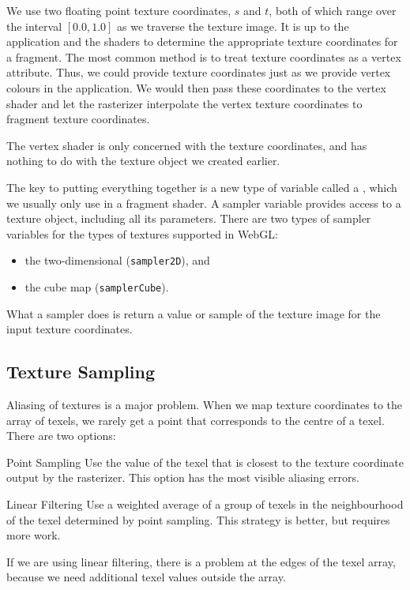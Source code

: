 \documentclass[../COS3712_Notes.tex]{subfiles}
\begin{document}
        We use two floating point texture coordinates, $s$ and $t$,
        both of which range over the interval $[0.0, 1.0]$ as we traverse the texture image.
        It is up to the application and the shaders to determine the appropriate texture
        coordinates for a fragment.
        The most common method is to treat texture coordinates as a vertex attribute.
        Thus, we could provide texture coordinates just as we provide vertex colours
        in the application.
        We would then pass these coordinates to the vertex shader and let the rasterizer
        interpolate the vertex texture coordinates to fragment texture coordinates.

        The vertex shader is only concerned with the texture coordinates,
        and has nothing to do with the texture object we created earlier.

        The key to putting everything together is a new type of variable called a ,
        which we usually only use in a fragment shader.
        A sampler variable provides access to a texture object, including all its parameters.
        There are two types of sampler variables for the types of textures supported in WebGL:
        \begin{itemize}
          \item the two-dimensional (\texttt{sampler2D}), and
          \item the cube map (\texttt{samplerCube}).
        \end{itemize}
        What a sampler does is return a value or sample of the texture image
        for the input texture coordinates.

      \subsection{Texture Sampling}
        Aliasing of textures is a major problem.
        When we map texture coordinates to the array of texels, we rarely get a point
        that corresponds to the centre of a texel.
        There are two options:
        \begin{descriptimize}
          \item[Point Sampling] Use the value of the texel that is closest to the texture
            coordinate output by the rasterizer.
            This option has the most visible aliasing errors.
          \item[Linear Filtering] Use a weighted average of a group of texels in the neighbourhood
            of the texel determined by point sampling.
            This strategy is better, but requires more work.
        \end{descriptimize}
        If we are using linear filtering, there is a problem at the edges of the texel array,
        because we need additional texel values outside the array.
\end{document}
